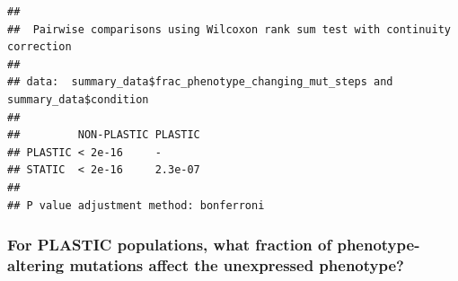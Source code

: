 \documentclass[]{book}
\newenvironment{Shaded}{\begin{snugshade}}{\end{snugshade}}
\newcommand{\DataTypeTok}[1]{\textcolor[rgb]{0.13,0.29,0.53}{#1}}
\newcommand{\DecValTok}[1]{\textcolor[rgb]{0.00,0.00,0.81}{#1}}
\newcommand{\KeywordTok}[1]{\textcolor[rgb]{0.13,0.29,0.53}{\textbf{#1}}}
\newcommand{\NormalTok}[1]{#1}
\newcommand{\OperatorTok}[1]{\textcolor[rgb]{0.81,0.36,0.00}{\textbf{#1}}}
\newcommand{\StringTok}[1]{\textcolor[rgb]{0.31,0.60,0.02}{#1}}
\begin{document}
\begin{verbatim}
## 
##  Pairwise comparisons using Wilcoxon rank sum test with continuity correction 
## 
## data:  summary_data$frac_phenotype_changing_mut_steps and summary_data$condition 
## 
##         NON-PLASTIC PLASTIC
## PLASTIC < 2e-16     -      
## STATIC  < 2e-16     2.3e-07
## 
## P value adjustment method: bonferroni
\end{verbatim}

\hypertarget{for-plastic-populations-what-fraction-of-phenotype-altering-mutations-affect-the-unexpressed-phenotype}{%
\subsubsection{For PLASTIC populations, what fraction of phenotype-altering mutations affect the unexpressed phenotype?}\label{for-plastic-populations-what-fraction-of-phenotype-altering-mutations-affect-the-unexpressed-phenotype}}

\begin{Shaded}
\end{Shaded}
\end{document}
